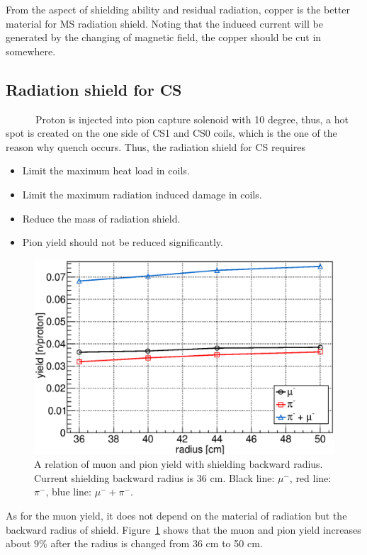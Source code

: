 From the aspect of shielding ability and residual radiation, copper is the better material for MS radiation shield.
Noting that the induced current will be generated by the changing of magnetic field, the copper should be cut in somewhere.

\subsection{Radiation shield for CS}
~~~~~~Proton is injected into pion capture solenoid with 10 degree, thus, a hot spot is created on the one side of CS1 and CS0 coils, which is the one of the reason why quench occurs.
Thus, the radiation shield for CS requires
\begin{itemize}
 \setlength{\itemsep}{-5pt}
 \item Limit the maximum heat load in coils.
 \item Limit the maximum radiation induced damage in coils.
 \item Reduce the mass of radiation shield.
 \item Pion yield should not be reduced significantly.
\end{itemize}
\begin{figure}[H]
 \centering
 \includegraphics[scale=0.43]{chapter3/fig/muon.eps}
 \caption{A relation of muon and pion yield with shielding backward radius. Current shielding backward radius is 36 cm. Black line: $\mu^-$, red line: $\pi^-$, blue line: $\mu^- + \pi^-$.}
 \label{radius}
\end{figure}
As for the muon yield, it does not depend on the material of radiation but the backward radius of shield.
Figure~\ref{radius} shows that the muon and pion yield increases about 9\% after the radius is changed from 36 cm to 50 cm.

